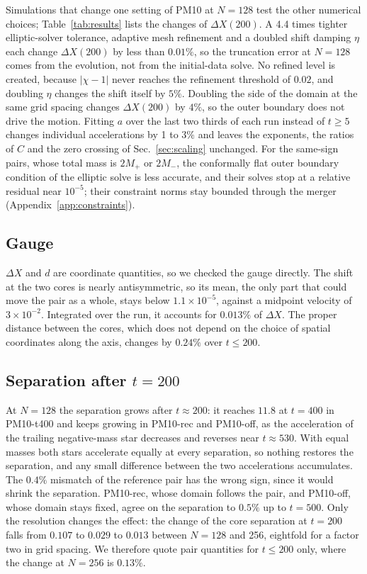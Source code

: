 \documentclass[twocolumn,floatfix,aps,prd,superscriptaddress,nofootinbib]{revtex4-2}
\begin{document}
Simulations that change one setting of PM10 at $N=128$ test the other numerical choices; Table~\ref{tab:results} lists the changes of $\Delta X(200)$. A 4.4 times tighter elliptic-solver tolerance, adaptive mesh refinement and a doubled shift damping $\eta$ each change $\Delta X(200)$ by less than $0.01\%$, so the truncation error at $N=128$ comes from the evolution, not from the initial-data solve. No refined level is created, because $|\chi-1|$ never reaches the refinement threshold of $0.02$, and doubling $\eta$ changes the shift itself by $5\%$. Doubling the side of the domain at the same grid spacing changes $\Delta X(200)$ by $4\%$, so the outer boundary does not drive the motion. Fitting $a$ over the last two thirds of each run instead of $t\ge5$ changes individual accelerations by 1 to $3\%$ and leaves the exponents, the ratios of $C$ and the zero crossing of Sec.~\ref{sec:scaling} unchanged. For the same-sign pairs, whose total mass is $2M_+$ or $2M_-$, the conformally flat outer boundary condition of the elliptic solve is less accurate, and their solves stop at a relative residual near $10^{-5}$; their constraint norms stay bounded through the merger (Appendix~\ref{app:constraints}).

\subsection{Gauge}

$\Delta X$ and $d$ are coordinate quantities, so we checked the gauge directly. The shift at the two cores is nearly antisymmetric, so its mean, the only part that could move the pair as a whole, stays below $1.1\times10^{-5}$, against a midpoint velocity of $3\times10^{-2}$. Integrated over the run, it accounts for $0.013\%$ of $\Delta X$. The proper distance between the cores, which does not depend on the choice of spatial coordinates along the axis, changes by $0.24\%$ over $t\le200$.

\subsection{Separation after $t=200$}

At $N=128$ the separation grows after $t\approx200$: it reaches $11.8$ at $t=400$ in PM10-t400 and keeps growing in PM10-rec and PM10-off, as the acceleration of the trailing negative-mass star decreases and reverses near $t\approx530$. With equal masses both stars accelerate equally at every separation, so nothing restores the separation, and any small difference between the two accelerations accumulates. The $0.4\%$ mismatch of the reference pair has the wrong sign, since it would shrink the separation. PM10-rec, whose domain follows the pair, and PM10-off, whose domain stays fixed, agree on the separation to $0.5\%$ up to $t=500$. Only the resolution changes the effect: the change of the core separation at $t=200$ falls from $0.107$ to $0.029$ to $0.013$ between $N=128$ and 256, eightfold for a factor two in grid spacing. We therefore quote pair quantities for $t\le200$ only, where the change at $N=256$ is $0.13\%$.
\end{document}
